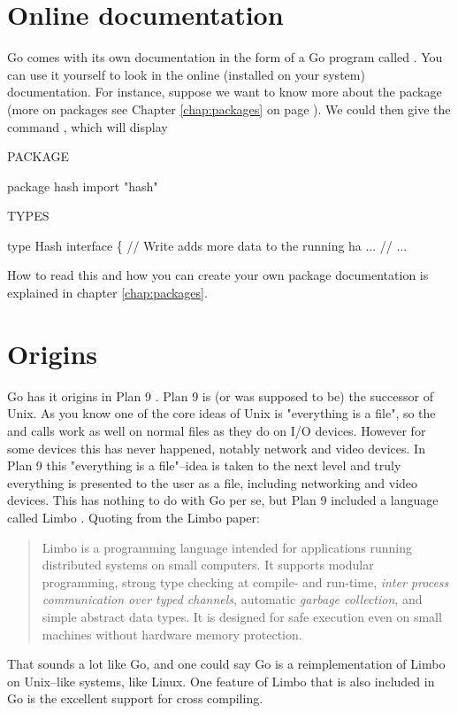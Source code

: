 \section{Online documentation}
Go comes with its own documentation in the form of a Go program called
. 
You can use it yourself to look
in the online (installed on your system) documentation. For
instance, suppose we want to know more about the package  
(more on packages see Chapter \ref{chap:packages} on page
\pageref{chap:packages}). We could then give the command
, which will display
\begin{display}
PACKAGE

package hash
import "hash"

TYPES

type Hash interface \{
    // Write adds more data to the running ha ...
    // ...
\end{display}
How to read this and how you can create your own package documentation
is explained in chapter \ref{chap:packages}.

\section{Origins}
Go has it origins in Plan 9 \cite{plan9}. Plan 9 is (or was 
supposed to be) the successor of Unix. As you know one of the
core ideas of Unix is "everything is a file", so the  and
 calls work as well on normal files as they do on I/O
devices. However for some devices this has never happened, notably
network and video devices. In Plan 9 this "everything is a file"--idea
is taken to the next level and truly everything is presented to the 
user as a file, including networking and video devices. This has nothing
to do with Go per se, but Plan 9 included a language called Limbo
\cite{limbo}. Quoting from the Limbo paper:
\begin{quote}
Limbo is a programming language intended for applications running
distributed systems on small computers. It supports modular programming,
strong type checking at compile- and run-time, \emph{inter process
communication over typed channels}, automatic \emph{garbage collection}, and
simple abstract data types. It is designed for safe execution even on
small machines without hardware memory protection.
\end{quote}
That sounds a lot like Go, and one could say Go is a reimplementation of
Limbo on Unix--like systems, like Linux. One feature of Limbo that is
also included in Go is the excellent support for cross compiling.

